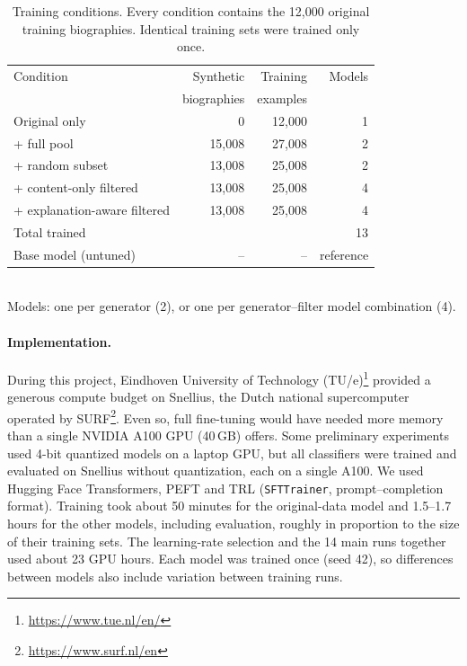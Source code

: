 \documentclass[sigconf]{acmart}
\begin{document}
\begin{table}[H]
  \centering
  \caption{Training conditions. Every condition contains the 12,000 original training biographies. Identical training sets were trained only once.}
  \label{tab:conditions}
  \small
  \begin{tabular}{lrrr}
    \toprule
    Condition & Synthetic & Training & Models \\
              & biographies & examples & \\
    \midrule
    Original only                 & 0      & 12,000 & 1 \\
    + full pool                   & 15,008 & 27,008 & 2 \\
    + random subset               & 13,008 & 25,008 & 2 \\
    + content-only filtered       & 13,008 & 25,008 & 4 \\
    + explanation-aware filtered  & 13,008 & 25,008 & 4 \\
    \midrule
    Total trained                 &        &        & 13 \\
    Base model (untuned)          & --     & --     & reference \\
    \bottomrule
  \end{tabular}\\[2pt]
  {\footnotesize Models: one per generator (2), or one per generator--filter model combination (4).}
\end{table}

\paragraph{Implementation.}
During this project, Eindhoven University of Technology (TU/e)\footnote{\url{https://www.tue.nl/en/}} provided a generous compute budget on Snellius, the Dutch national supercomputer operated by SURF\footnote{\url{https://www.surf.nl/en}}. Even so, full fine-tuning would have needed more memory than a single NVIDIA A100 GPU (40\,GB) offers. Some preliminary experiments used 4-bit quantized models on a laptop GPU, but all classifiers were trained and evaluated on Snellius without quantization, each on a single A100. We used Hugging Face Transformers, PEFT and TRL (\texttt{SFTTrainer}, prompt--completion format). Training took about 50 minutes for the original-data model and 1.5--1.7 hours for the other models, including evaluation, roughly in proportion to the size of their training sets. The learning-rate selection and the 14 main runs together used about 23 GPU hours. Each model was trained once (seed 42), so differences between models also include variation between training runs.
\end{document}
